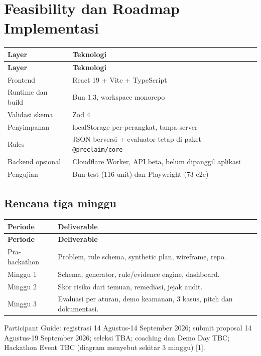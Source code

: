\documentclass[11pt,a4paper]{article}
\begin{document}
\section{Feasibility dan Roadmap Implementasi}
\begin{longtable}{|p{5cm}|p{10cm}|}
\hline
\rowcolor{blue!15} \textbf{Layer} & \textbf{Teknologi} \\ \hline
\endfirsthead
\hline
\rowcolor{blue!15} \textbf{Layer} & \textbf{Teknologi} \\ \hline
\endhead
Frontend & React 19 + Vite + TypeScript \\ \hline
Runtime dan build & Bun 1.3, workspace monorepo \\ \hline
Validasi skema & Zod 4 \\ \hline
Penyimpanan & localStorage per-perangkat, tanpa server \\ \hline
Rules & JSON berversi + evaluator tetap di paket \texttt{@preclaim/core} \\ \hline
Backend opsional & Cloudflare Worker, API beta, belum dipanggil aplikasi \\ \hline
Pengujian & Bun test (116 unit) dan Playwright (73 e2e) \\ \hline
\end{longtable}
\subsection{Rencana tiga minggu}
\begin{longtable}{|p{4cm}|p{11cm}|}
\hline
\rowcolor{blue!15} \textbf{Periode} & \textbf{Deliverable} \\ \hline
\endfirsthead
\hline
\rowcolor{blue!15} \textbf{Periode} & \textbf{Deliverable} \\ \hline
\endhead
Pra-hackathon & Problem, rule schema, synthetic plan, wireframe, repo. \\ \hline
Minggu 1 & Schema, generator, rule/evidence engine, dashboard. \\ \hline
Minggu 2 & Skor risiko dari temuan, remediasi, jejak audit. \\ \hline
Minggu 3 & Evaluasi per aturan, demo keamanan, 3 kasus, pitch dan dokumentasi. \\ \hline
\end{longtable}
Participant Guide: registrasi 14 Agustus-14 September 2026; submit proposal 14 Agustus-19 September 2026; seleksi TBA; coaching dan Demo Day TBC; Hackathon Event TBC (diagram menyebut sekitar 3 minggu) [1].
\end{document}
